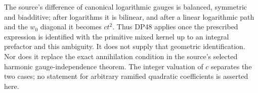 The source's difference of canonical logarithmic gauges is balanced, symmetric and biadditive; after logarithms it is bilinear, and after a linear logarithmic path and the $w_0$ diagonal it becomes $ct^2$. Thus DP48 applies once the prescribed expression is identified with the primitive mixed kernel up to an integral prefactor and this ambiguity. It does not supply that geometric identification. Nor does it replace the exact annihilation condition in the source's selected harmonic gauge-independence theorem. The integer valuation of $c$ separates the two cases; no statement for arbitrary ramified quadratic coefficients is asserted here.

